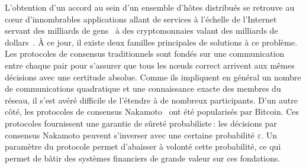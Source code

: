 \documentclass[letterpaper,twocolumn,10pt]{article}
\theoremstyle{definition}
\begin{document}
L'obtention d'un accord au sein d'un ensemble d'hôtes distribués se retrouve au cœur d'innombrables applications allant de services à l'échelle de l'Internet servant des milliards de gens~\cite{Burrows06,HuntKJR10} à des cryptomonnaies valant des milliards de dollars~\cite{marketcapcryptocurrency}.
À ce jour, il existe deux familles principales de solutions à ce problème.
Les protocoles de consensus traditionnels
sont fondés sur une communication entre chaque pair pour s'assurer que tous les nœuds correct arrivent aux mêmes décisions avec une certitude absolue.
Comme ils impliquent en général un nombre de communications quadratique et une connaissance exacte des membres du réseau, il s'est avéré difficile de l'étendre
à de nombreux participants.
D'un autre côté, les protocoles de consensus Nakamoto~\cite{nakamoto2008bitcoin,GarayKL15, PassSS17, SompolinskyZ15, SompolinskyLZ16, SompolinskyZ18, BentovHMN17, EyalGSR16,Kokoris-KogiasJ16,PassS16a, PassS18} ont été popularisés par Bitcoin.
Ces protocoles fournissent une garantie de sûreté probabiliste\,: les décisions par consensus Nakamoto peuvent s'inverser avec une certaine probabilité $\varepsilon$.
Un paramètre du protocole permet d'abaisser à volonté cette probabilité, ce qui permet de bâtir des systèmes financiers de grande valeur sur ces fondations.
\end{document}
